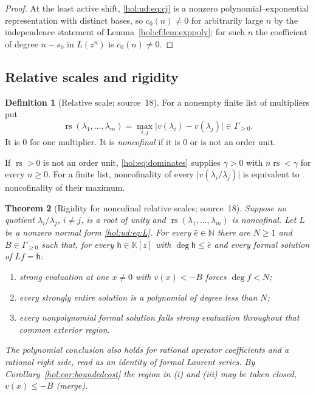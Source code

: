 \documentclass[11pt]{article}
\numberwithin{equation}{section}
\newtheorem{theorem}{Theorem}[section]
\theoremstyle{definition}
\newtheorem{definition}[theorem]{Definition}
\theoremstyle{remark}
\newcommand{\N}{\mathbb N}
\newcommand{\abs}[1]{\lvert#1\rvert}
\newcommand{\KK}{\mathbb K}
\begin{document}
\begin{proof}
At the least active shift, \eqref{hol:ud:eq:cj} is a nonzero
polynomial--exponential representation with distinct bases, so $c_0(n)\ne0$
for arbitrarily large $n$ by the independence statement of
Lemma~\ref{hol:cf:lem:exppoly}; for such $n$ the coefficient of degree $n-s_0$
in $L(z^n)$ is $c_0(n)\ne0$.
\end{proof}

\subsection{Relative scales and rigidity}\label{hol:ud:sub:rigidity}

\begin{definition}[Relative scale; source~18]\label{hol:ud:def:rs}
For a nonempty finite list of multipliers put
\[
 \operatorname{rs}(\lambda_1,\ldots,\lambda_m)=\max_{i,j}\abs{v(\lambda_i)-
 v(\lambda_j)}\in\Gamma_{\ge0}.
\]
It is $0$ for one multiplier. It is \emph{noncofinal} if it is $0$ or is not
an order unit.
\end{definition}

If $\operatorname{rs}>0$ is not an order unit, \eqref{hol:eq:dominates}
supplies $\gamma>0$ with $n\operatorname{rs}<\gamma$ for every $n\ge0$. For a
finite list, noncofinality of every $\abs{v(\lambda_i/\lambda_j)}$ is
equivalent to noncofinality of their maximum.

\begin{theorem}[Rigidity for noncofinal relative scales; source~18]
\label{hol:ud:thm:rigidity}
Suppose no quotient $\lambda_i/\lambda_j$, $i\ne j$, is a root of unity and
$\operatorname{rs}(\lambda_1,\ldots,\lambda_m)$ is noncofinal. Let $L$ be a
nonzero normal form \eqref{hol:ud:eq:L}. For every $\bar e\in\N$ there are
$N\ge1$ and $B\in\Gamma_{\ge0}$ such that, for every $\mathsf h\in\KK[z]$ with
$\deg\mathsf h\le\bar e$ and every formal solution of $Lf=\mathsf h$:
\begin{enumerate}[label=\textup{(\roman*)}]
\item strong evaluation at one $x\ne0$ with $v(x)<-B$ forces $\deg f<N$;
\item every strongly entire solution is a polynomial of degree less than $N$;
\item every nonpolynomial formal solution fails strong evaluation throughout
that common exterior region.
\end{enumerate}
The polynomial conclusion also holds for rational operator coefficients and a
rational right side, read as an identity of formal Laurent series. By
Corollary~\ref{hol:cor:boundedcost} the region in \textup{(i)} and
\textup{(iii)} may be taken closed, $v(x)\le-B$ \emph{(merge)}.
\end{theorem}
\end{document}
